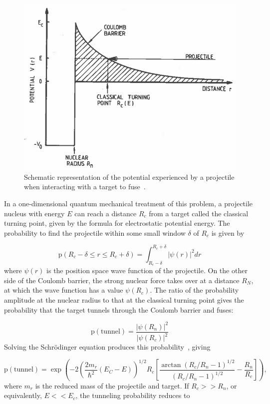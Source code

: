 \documentclass[12pt]{article}
\newcommand{\bigparenthesis}[1]{\left(#1\right)}
\begin{document}
\begin{figure}[H]
    \centering
    \includegraphics[width=0.5\linewidth]{Appendices//Nuclear Fusion/potential_barrier.png}
    \caption{Schematic representation of the potential experienced by a projectile when interacting with a target to fuse~\cite{Rolfs1988}.}
    \label{fig:fusion_potential}
\end{figure}

In a one-dimensional quantum mechanical treatment of this problem, a projectile nucleus with energy $E$ can reach a distance $R_c$ from a target called the classical turning point, given by the formula for electrostatic potential energy. The probability to find the projectile within some small window $\delta$ of $R_c$ is given by

\begin{equation}
    \text{p}(R_c - \delta \leq r \leq R_c + \delta) = \int_{R_c - \delta}^{R_c + \delta} |\psi(r)|^2 dr
\end{equation}
%
where $\psi(r)$ is the position space wave function of the projectile. On the other side of the Coulomb barrier, the strong nuclear force takes over at a distance $R_N$, at which the wave function has a value $\psi(R_c)$. The ratio of the probability amplitude at the nuclear radius to that at the classical turning point gives the probability that the target tunnels through the Coulomb barrier and fuses:

\begin{equation}
    \text{p}(\text{tunnel}) = \frac{|\psi(R_n)|^2}{|\psi(R_c)|^2}
\end{equation}
%
Solving the Schr{\"o}dinger equation produces this probability~\cite{Rolfs1988}, giving

\begin{equation}
    \text{p}(\text{tunnel}) =  \exp \bigparenthesis{-2\bigparenthesis{\frac{2m_r}{\hbar^2}(E_C - E)}^{1/2} R_c \left[\frac{\arctan(R_c/R_n - 1)^{1/2}}{(R_c/R_n - 1)^{1/2}} - \frac{R_n}{R_c} \right]},
\end{equation}
%
where $m_r$ is the reduced mass of the projectile and target. If $R_c >> R_n$, or equivalently, $E<<E_c$, the tunneling probability reduces to 
\end{document}
